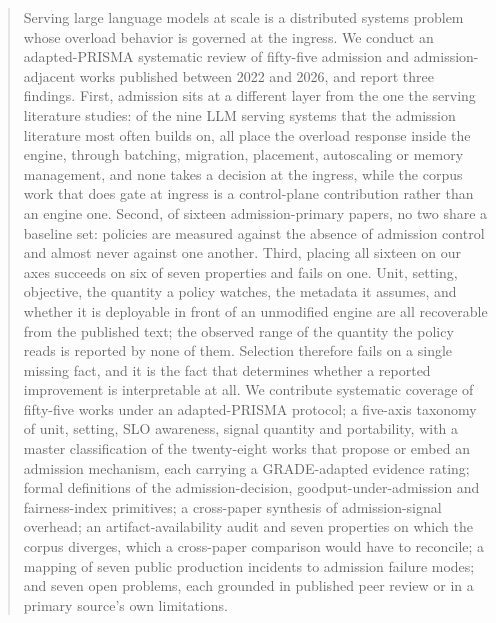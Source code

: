 \begin{abstract}
\noindent
Serving large language models at scale is a distributed systems problem
whose overload behavior is governed at the ingress. We conduct an
adapted-PRISMA systematic review of fifty-five admission and
admission-adjacent works published between 2022 and 2026, and report
three findings. First, admission sits at a different
layer from the one the serving literature studies: of the nine LLM
serving systems that the admission literature most often builds on, all
place the overload response inside the engine, through batching,
migration, placement, autoscaling or memory management, and none takes
a decision at the ingress, while the corpus work that does gate at
ingress is a control-plane contribution rather than an engine one.
Second, of sixteen admission-primary papers, no two share a baseline
set: policies are measured against the absence of admission control and
almost never against one another. Third, placing all sixteen on our
axes succeeds on six of seven properties and fails on one. Unit,
setting, objective, the quantity a policy watches, the metadata it
assumes, and whether it is deployable in front of an unmodified engine
are all recoverable from the published text; the observed range of the
quantity the policy reads is reported by none of them. Selection
therefore fails on a single missing fact, and it is the fact that
determines whether a reported improvement is interpretable at all.
We contribute systematic coverage of fifty-five works under an
adapted-PRISMA protocol; a five-axis taxonomy of unit, setting, SLO
awareness, signal quantity and portability, with a master
classification of the twenty-eight works that propose or embed an
admission mechanism, each carrying a GRADE-adapted evidence rating;
formal definitions of the admission-decision, goodput-under-admission
and fairness-index primitives; a cross-paper synthesis of
admission-signal overhead; an artifact-availability audit and seven
properties on which the corpus diverges, which a cross-paper comparison
would have to reconcile; a mapping of seven
public production incidents to admission failure modes; and seven open
problems, each grounded in published peer review or in a primary
source's own limitations.
\end{abstract}
